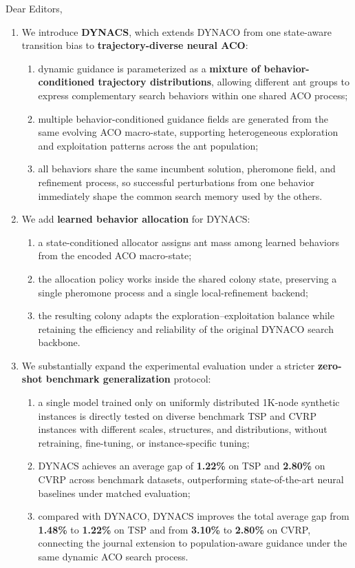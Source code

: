 \documentclass[11pt]{letter}
\begin{document}
\begin{letter}{
Dear Editors,
}
\begin{enumerate}
\item We introduce \textbf{DYNACS}, which extends DYNACO from one state-aware transition bias to \textbf{trajectory-diverse neural ACO}:
\begin{enumerate}
\item dynamic guidance is parameterized as a \textbf{mixture of behavior-conditioned trajectory distributions}, allowing different ant groups to express complementary search behaviors within one shared ACO process;
\item multiple behavior-conditioned guidance fields are generated from the same evolving ACO macro-state, supporting heterogeneous exploration and exploitation patterns across the ant population;
\item all behaviors share the same incumbent solution, pheromone field, and refinement process, so successful perturbations from one behavior immediately shape the common search memory used by the others.
\end{enumerate}

\item We add \textbf{learned behavior allocation} for DYNACS:
\begin{enumerate}
    \item a state-conditioned allocator assigns ant mass among learned behaviors from the encoded ACO macro-state;
    \item the allocation policy works inside the shared colony state, preserving a single pheromone process and a single local-refinement backend;
    \item the resulting colony adapts the exploration--exploitation balance while retaining the efficiency and reliability of the original DYNACO search backbone.
\end{enumerate}

\item We substantially expand the experimental evaluation under a stricter \textbf{zero-shot benchmark generalization} protocol:
\begin{enumerate}
    \item a single model trained only on uniformly distributed 1K-node synthetic instances is directly tested on diverse benchmark TSP and CVRP instances with different scales, structures, and distributions, without retraining, fine-tuning, or instance-specific tuning;
    \item DYNACS achieves an average gap of \textbf{1.22\%} on TSP and \textbf{2.80\%} on CVRP across benchmark datasets, outperforming state-of-the-art neural baselines under matched evaluation;
    \item compared with DYNACO, DYNACS improves the total average gap from \textbf{1.48\%} to \textbf{1.22\%} on TSP and from \textbf{3.10\%} to \textbf{2.80\%} on CVRP, connecting the journal extension to population-aware guidance under the same dynamic ACO search process.
\end{enumerate}


\end{enumerate}
\end{letter}
\end{document}
